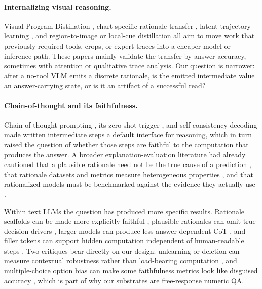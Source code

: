 \documentclass[11pt]{article}
\begin{document}
\paragraph{Internalizing visual reasoning.}
Visual Program Distillation \citep{vpd}, chart-specific rationale transfer \citep{chartpali,chartr1}, latent trajectory learning \citep{pearl,capimagine2026}, and region-to-image or local-cue distillation \citep{zoomingwithoutzooming,locus} all aim to move work that previously required tools, crops, or expert traces into a cheaper model or inference path. These papers mainly validate the transfer by answer accuracy, sometimes with attention or qualitative trace analysis. Our question is narrower: after a no-tool VLM emits a discrete rationale, is the emitted intermediate value an answer-carrying state, or is it an artifact of a successful read?

\paragraph{Chain-of-thought and its faithfulness.}
Chain-of-thought prompting \citep{wei2022cot}, its zero-shot trigger \citep{kojima2022zeroshot}, and self-consistency decoding \citep{wang2023selfconsistency} made written intermediate steps a default interface for reasoning, which in turn raised the question of whether those steps are faithful to the computation that produces the answer. A broader explanation-evaluation literature had already cautioned that a plausible rationale need not be the true cause of a prediction \citep{jacovi2020faithfulness}, that rationale datasets and metrics measure heterogeneous properties \citep{wiegreffe2021teach}, and that rationalized models must be benchmarked against the evidence they actually use \citep{deyoung2020eraser}.

Within text LLMs the question has produced more specific results. Rationale scaffolds can be made more explicitly faithful \citep{lyu2023}, plausible rationales can omit true decision drivers \citep{turpin2023}, larger models can produce less answer-dependent CoT \citep{lanham2023}, and filler tokens can support hidden computation independent of human-readable steps \citep{pfau2024}. Two critiques bear directly on our design: unlearning or deletion can measure contextual robustness rather than load-bearing computation \citep{tutek2025}, and multiple-choice option bias can make some faithfulness metrics look like disguised accuracy \citep{bentham2024}, which is part of why our substrates are free-response numeric QA.
\end{document}
